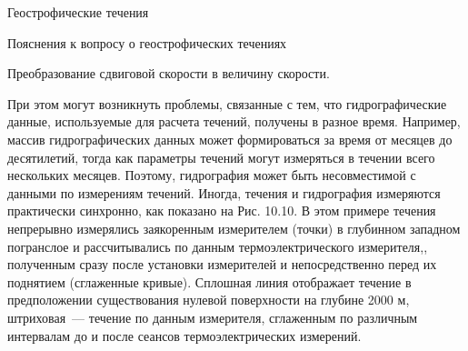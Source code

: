 \begin{chapter}{Геострофические течения}
\begin{section}{Пояснения к вопросу о геострофических течениях}
\begin{paragraph}{Преобразование сдвиговой скорости в величину скорости. }
\begin{enumerate}
При этом могут возникнуть проблемы, связанные с тем, что
гидрографические данные, используемые для расчета течений, получены в
разное время. Например, массив гидрографических данных может
формироваться за время от месяцев до десятилетий, тогда как параметры
течений могут измеряться в течении всего нескольких месяцев. Поэтому,
гидрография может быть несовместимой с данными по измерениям
течений. Иногда, течения и гидрография измеряются практически
синхронно, как показано на Рис. 10.10. В этом примере течения
непрерывно измерялись заякоренным измерителем (точки) в глубинном
западном погранслое и рассчитывались по данным термоэлектрического
измерителя,, полученным сразу после установки измерителей и
непосредственно перед их поднятием (сглаженные кривые). Сплошная линия
отображает течение в предположении существования нулевой поверхности
на глубине 2000 м, штриховая~--- течение по данным измерителя,
сглаженным по различным интервалам до и после сеансов
термоэлектрических измерений.
%


\end{enumerate}
\end{paragraph}
\end{section}
\end{chapter}
